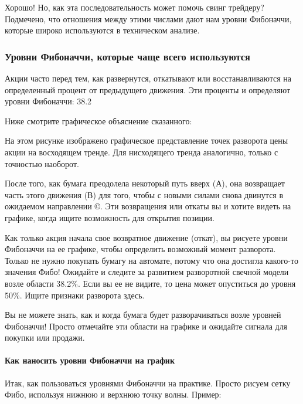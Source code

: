 \documentclass{book}
\begin{document}
Хорошо! Но, как эта последовательность может помочь свинг трейдеру?
Подмечено, что отношения между этими числами дают нам уровни
Фибоначчи, которые широко используются в техническом анализе.

\subsubsection{Уровни Фибоначчи, которые чаще всего используются}

Акции часто перед тем, как развернутся, откатывают или восстанавливаются на определенный процент от предыдущего движения. Эти проценты и определяют уровни Фибоначчи: 38.2%

Ниже смотрите графическое объяснение сказанного:

На этом рисунке изображено графическое представление точек разворота цены акции на восходящем тренде. Для нисходящего тренда аналогично, только с точностью наоборот.

После того, как бумага преодолела некоторый путь вверх (А), она возвращает часть этого движения (В) для того, чтобы с новыми силами снова двинутся в ожидаемом направлении ©. Эти возвращения или откаты вы и хотите видеть на графике, когда ищите возможность для открытия позиции.

Как только акция начала свое возвратное движение (откат), вы рисуете уровни Фибоначчи на ее графике, чтобы определить возможный момент разворота. Только не нужно покупать бумагу на автомате, потому что она достигла какого-то значения Фибо! Ожидайте и следите за развитием разворотной свечной модели возле области 38.2\%. Если вы ее не видите, то цена может опуститься до уровня 50\%. Ищите признаки разворота здесь.

Вы не можете знать, как и когда бумага будет разворачиваться возле уровней Фибоначчи! Просто отмечайте эти области на графике и ожидайте сигнала для покупки или продажи.

\paragraph{Как наносить уровни Фибоначчи на график}

Итак, как пользоваться уровнями Фибоначчи на практике. Просто рисуем сетку Фибо, используя нижнюю и верхнюю точку волны. Пример:
\end{document}

